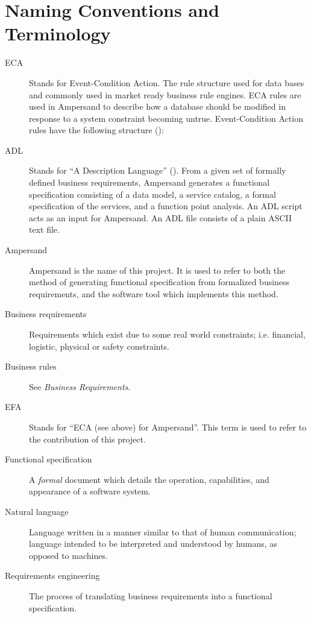 \documentclass[12pt]{report}
\begin{document}
\section{Naming Conventions and Terminology}\label{sec:Naming} 
\begin{description}
\item[ECA] Stands for Event-Condition Action. The rule structure used for data
  bases and commonly used in market ready business rule engines. ECA rules are
  used in Ampersand to describe how a database should be modified in response to
  a system constraint becoming untrue. Event-Condition Action rules have
  the following structure (\cite[8--9]{RBD}):
\item [ADL] Stands for ``A Description Language'' (\cite[13]{derFun}). From a
given set of formally defined business requirements, Ampersand generates a
functional specification consisting of a data model, a service catalog, a
formal specification of the services, and a function point analysis. An ADL
script acts as an input for Ampersand. An ADL file consists of a plain ASCII
text file.
\item [Ampersand] Ampersand is the name of this project. It is used to refer to
both the method of generating functional specification from formalized
business requirements, and the software tool which implements this method.
\item [Business requirements] Requirements which exist due to some real world constraints;
i.e.
financial, logistic, physical or safety constraints. 
\item [Business rules] See \emph{Business Requirements}.
\item [EFA] Stands for ``ECA (see above) for Ampersand''. This term is used to refer to 
  the contribution of this project. 
\item [Functional specification] A \emph{formal} document which details the operation,
  capabilities, and appearance of a software system. 

\item [Natural language] Language written in a manner similar
to that of human communication; 
  language intended to be interpreted and understood by humans, as opposed to machines. 
\item [Requirements engineering] The process of translating business
requirements into a functional specification. 
 


\end{description}
\end{document}
